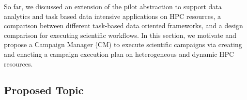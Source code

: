 \label{research}
So far, we discussed an extension of the pilot abstraction to support data analytics and task based data intensive applications on HPC resources, a comparison between different task-based data oriented frameworks, and a design comparison for executing scientific workflows.
In this section, we motivate and propose a Campaign Manager (CM) to execute scientific campaigns via creating and enacting a campaign execution plan on heterogeneous and dynamic HPC resources. 

\subsection{Proposed Topic}


